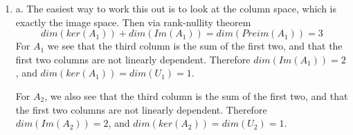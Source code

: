 \documentclass{article}
\newcommand{\chapternumber}{2}
\newenvironment{QandA}{\begin{enumerate}[label=\chapternumber.\arabic*]\bfseries\boldmath}
	{\end{enumerate}}
\newenvironment{answered}{\par\bigskip\normalfont\unboldmath}{}
\begin{document}
\begin{QandA}
\begin{answered}
			We can now stop since we have determined all possible value combinations for $b_1,b_2,b_3$, and so we have the general form for $x$ as
			\[
			\begin{pmatrix}
				-1 &  2 & -3 \\
				-2 & -2 &  6 \\
				2 &  0 & -2 \\
				1 &  0 & -1 \\
			\end{pmatrix}
			\begin{pmatrix}
				b_1 \\ b_2 \\ \frac{3b_1+2b_2}{7}
			\end{pmatrix}
			=
			\frac{1}{7}
			\begin{pmatrix}
				-16b_1+8b_2 \\ 4b_1-2b_2 \\ 8b_1-4b_2 \\ 4b_1-2b_2
			\end{pmatrix}
			=(2b_1-b_2)
			\begin{pmatrix}
				-8 \\ 2 \\ 4 \\ 2
			\end{pmatrix}
			\]
			We can select $b_1,b_2$ to force $2b_1-b_2$ to take any value we like. Therefore the singleton set containing the vector
			\[\begin{pmatrix}
				-8 \\ 2 \\ 4 \\ 2
			\end{pmatrix}
			\]
			is a basis for $U_1\cap U_2$.
		\end{answered}
		
		\item
		\begin{answered}
			a. The easiest way to work this out is to look at the column space, which is exactly the image space. Then via rank-nullity theorem
			\[dim(ker(A_1))+dim(Im(A_1)) = dim(Preim(A_1))=3\]
			For $A_1$ we see that the third column is the sum of the first two, and that the first two columns are not linearly dependent. Therefore $dim(Im(A_1))=2$, and $dim(ker(A_1))=dim(U_1)=1$.
			
			For $A_2$, we also see that the third column is the sum of the first two, and that the first two columns are not linearly dependent. Therefore $dim(Im(A_2))=2$, and $dim(ker(A_2))=dim(U_2)=1$.
			

\end{answered}
\end{QandA}
\end{document}
